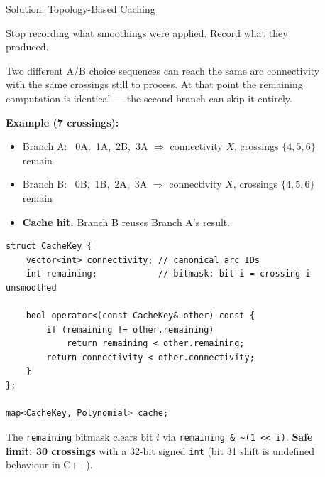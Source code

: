 \documentclass[final]{beamer}
\newlength{\sepwidth}
\newlength{\colwidth}
\newcommand{\separatorcolumn}{\begin{column}{\sepwidth}\end{column}}
\begin{document}
\begin{frame}[t,fragile]
\begin{columns}[t]
\begin{column}{\colwidth}
\end{column}

\separatorcolumn

\begin{column}{\colwidth}

  \begin{exampleblock}{Solution: Topology-Based Caching}

    Stop recording what smoothings were applied. Record what they produced.

    \vspace{0.1cm}
    Two different A/B choice sequences can reach the same arc connectivity with the same crossings still to process. At that point the remaining computation is identical --- the second branch can skip it entirely.

    \vspace{0.1cm}
    \textbf{Example (7 crossings):}
    \begin{itemize}\setlength\itemsep{0pt}
      \item Branch A: \ 0{\to}A,\ 1{\to}A,\ 2{\to}B,\ 3{\to}A $\Rightarrow$ connectivity $X$, crossings $\{4,5,6\}$ remain
      \item Branch B: \ 0{\to}B,\ 1{\to}B,\ 2{\to}A,\ 3{\to}A $\Rightarrow$ connectivity $X$, crossings $\{4,5,6\}$ remain
      \item \textbf{Cache hit.} Branch B reuses Branch A's result.
    \end{itemize}

    \vspace{0.1cm}

\begin{lstlisting}
struct CacheKey {
    vector<int> connectivity; // canonical arc IDs
    int remaining;            // bitmask: bit i = crossing i unsmoothed

    bool operator<(const CacheKey& other) const {
        if (remaining != other.remaining)
            return remaining < other.remaining;
        return connectivity < other.connectivity;
    }
};

map<CacheKey, Polynomial> cache;
\end{lstlisting}

    \vspace{0.1cm}
    The \texttt{remaining} bitmask clears bit $i$ via \texttt{remaining \& \textasciitilde(1 << i)}. \textbf{Safe limit: 30 crossings} with a 32-bit signed \texttt{int} (bit 31 shift is undefined behaviour in C++).
  \end{exampleblock}


\end{column}
\end{columns}
\end{frame}
\end{document}
